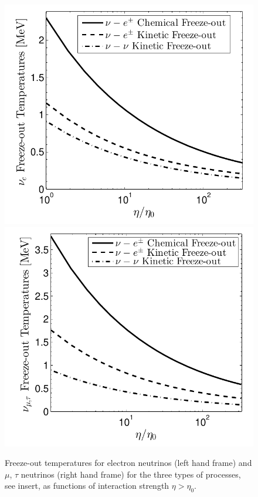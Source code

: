 \begin{figure}
\centerline{\includegraphics[width=0.49\linewidth]{plots/nu_e_freezeout_GF.pdf} \includegraphics[width=0.49\linewidth]{plots/nu_mu_freezeout_GF.pdf}}
\caption{Freeze-out temperatures for electron neutrinos (left hand frame) and $\mu$, $\tau$ neutrinos (right hand frame) for the three types of processes, see insert, as functions of interaction strength $\eta>\eta_0$. }
\label{fig:freeze-outT_eta}
 \end{figure}



